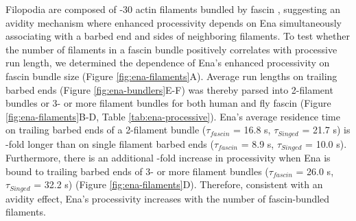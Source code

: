Filopodia are composed of -30 actin filaments bundled by fascin \citep{svitkina_mechanism_2003,faix_making_2006}, suggesting an avidity mechanism where enhanced processivity depends on Ena simultaneously associating with a barbed end and sides of neighboring filaments. To test whether the number of filaments in a fascin bundle positively correlates with processive run length, we determined the dependence of Ena's enhanced processivity on fascin bundle size (Figure \ref{fig:ena-filaments}A). Average run lengths on trailing barbed ends (Figure \ref{fig:ena-bundlers}E-F) was thereby parsed into 2-filament bundles or 3- or more filament bundles for both human and fly fascin (Figure \ref{fig:ena-filaments}B-D, Table \ref{tab:ena-processive}). Ena's average residence time on trailing barbed ends of a 2-filament bundle ($\tau_{fascin}$ = 16.8 s, $\tau_{Singed}$ = 21.7 s) is -fold longer than on single filament barbed ends ($\tau_{fascin}$ = 8.9 s, $\tau_{Singed}$ = 10.0 s). Furthermore, there is an additional -fold increase in processivity when Ena is bound to trailing barbed ends of 3- or more filament bundles ($\tau_{fascin}$ = 26.0 s, $\tau_{Singed}$ = 32.2 s) (Figure \ref{fig:ena-filaments}D). Therefore, consistent with an avidity effect, Ena's processivity increases with the number of fascin-bundled filaments. 

